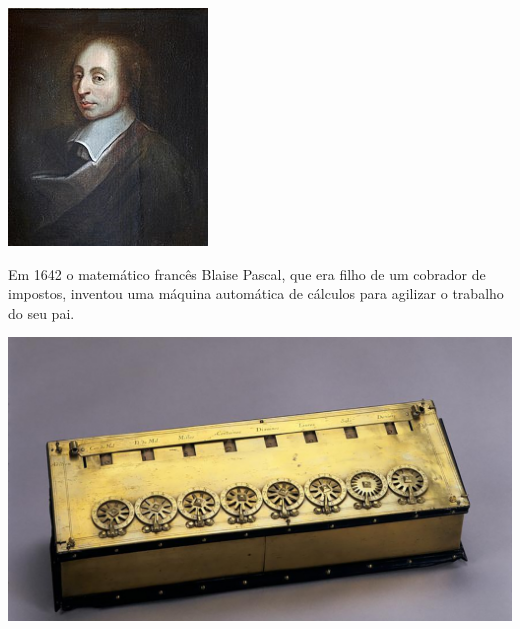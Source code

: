 \begin{multicols}{2}
	
	\begin{center}
		\includegraphics[height=.9\linewidth]{./IMG/Blaise_Pascal_Versailles.JPG}
	\end{center}


\vfill
\columnbreak

Em 1642 o matemático francês Blaise Pascal, que era filho de um cobrador de impostos, inventou uma máquina automática de cálculos para agilizar o trabalho do seu pai.

	\begin{center}
	\includegraphics[width=\linewidth]{./IMG/pascaline.jpg}
\end{center}

\end{multicols}

\vfill
\pagebreak
